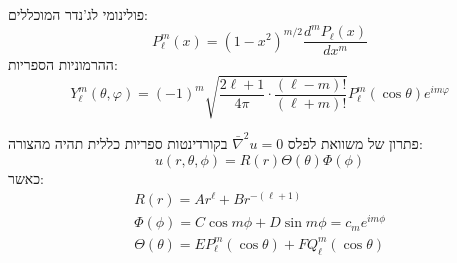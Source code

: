 \documentclass{tstextbook}
\begin{document}
\begin{reminder}
פולינומי לג'נדר המוכללים:
$$P_{\ell}^{m}\left(x\right)=\left(1-x^{2}\right)^{m/2}\frac{d^{m}P_{\ell}(x)}{d x^{m}}$$
ההרמוניות הספריות:
$$Y_{\ell}^{m}(\theta,\varphi)=(-1)^{m}\sqrt{\frac{2\ell+1}{4\pi}\cdot\frac{(\ell-m)!}{(\ell+m)!}}P_{\ell}^{m}(\cos\theta)e^{i m\varphi}$$

\end{reminder}
\begin{proposition}
פתרון של משוואת לפלס \(\bar{\nabla}^2u=0\) בקורדינטות ספריות כללית תהיה מהצורה:
$$u(r,\theta,\phi)=R(r)\Theta(\theta)\Phi(\phi)$$
כאשר:
$$ \begin{gather}R(r)=Ar^\ell+Br^{-\left( \ell+1 \right)}\\\Phi\left( \phi \right)= C\cos m\phi+D\sin m\phi = c_{m}e^{im\phi} \\ \Theta\left( \theta \right)= EP_\ell^m\left( \cos\theta \right)+FQ_\ell^m\left( \cos\theta \right)
\end{gather}$$

\end{proposition}
\end{document}
